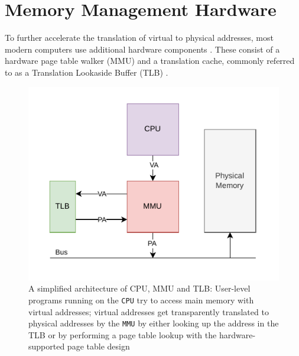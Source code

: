 


\section{Memory Management Hardware}
To further accelerate the translation of virtual to physical addresses, most modern computers use additional
\cite{denning1970virtual} hardware components . These consist of a hardware page table walker (MMU) and a translation cache,
commonly referred to as a Translation Lookaside Buffer (TLB) \cite{jacobVirtualMemoryContemporary1998}.

\begin{figure}[t]
    \centering
    \includegraphics[scale=1.2]{figures/simple_mmu_arch.pdf}
    \caption[A simplified architecture of CPU, MMU and TLB]{A simplified architecture of CPU, MMU and TLB:
        User-level programs running on the \texttt{CPU} try to access main memory with virtual
        addresses; virtual addresses get transparently translated to physical addresses by the
        \texttt{MMU} by either looking up the address in the TLB or by performing a page table
        lookup with the hardware-supported page table design}
    \label{fig:fund:simplearch}
\end{figure}

